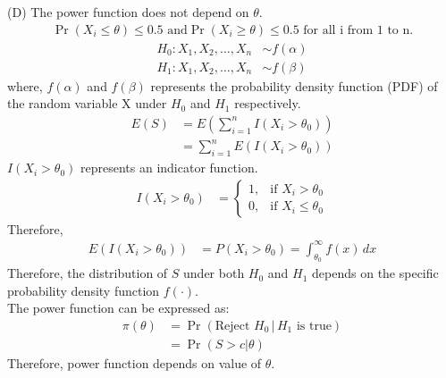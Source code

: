 \documentclass[journal,12pt,onecolumn]{IEEEtran}
\theoremstyle{remark}
\begin{document}
(D) The power function does not depend on $\theta$.
\\ \solution
\begin{align}
\Pr(X_i \leq \theta) \leq 0.5 \text{ and} \Pr(X_i \geq \theta) \leq 0.5 \text{ for all i from 1 to n.}
\end{align}
\begin{align}
H_0 : X_1, X_2, \ldots, X_n &\sim f(\alpha)\\
H_1 : X_1, X_2, \ldots, X_n &\sim f(\beta)
\end{align}
where, $f(\alpha)$ and $f(\beta)$ represents the probability density function (PDF) of the random variable X under $H_0$ and $H_1$ respectively.
\begin{align}
E(S) &= E\left(\sum_{i=1}^{n} I(X_i > \theta_0)\right)\\
     &=\sum_{i=1}^{n} E(I(X_i > \theta_0))
\end{align}
$I(X_i > \theta_0)$ represents an indicator function.
\begin{align}
 I(X_i > \theta_0) &=
 \begin{cases}
 1, & \text{if } X_i > \theta_0 \\
 0, & \text{if } X_i \leq \theta_0
 \end{cases}
\end{align}
Therefore,
\begin{align}
 E(I(X_i > \theta_0)) &= P(X_i > \theta_0) = \int_{\theta_0}^{\infty} f(x) \, dx
\end{align}
Therefore, the distribution of $S$ under both $H_0$ and $H_1$ depends on the specific probability density function $f(\cdot)$.\\
The power function can be expressed as:
\begin{align}
\pi(\theta) &= \Pr(\text{Reject } H_0 \, | \, H_1 \text{ is true})\\
&= \Pr(S > c | \theta)
\end{align}
Therefore, power function depends on value of $\theta$.
\end{document}
